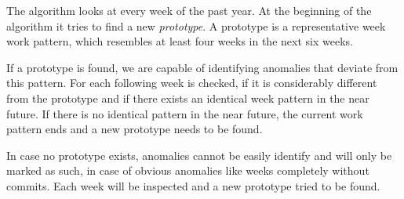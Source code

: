 The algorithm looks at every week of the past year.
At the beginning of the algorithm it tries to find a new \emph{prototype}.
A prototype is a representative week work pattern, which resembles at least four weeks in the next six weeks.

If a prototype is found, we are capable of identifying anomalies that deviate from this pattern.
For each following week is checked, if it is considerably different from the prototype and if there exists an identical week pattern in the near future.
If there is no identical pattern in the near future, the current work pattern ends and a new prototype needs to be found.

In case no prototype exists, anomalies cannot be easily identify and will only be marked as such, in case of obvious anomalies like weeks completely without commits.
Each week will be inspected and a new prototype tried to be found.
